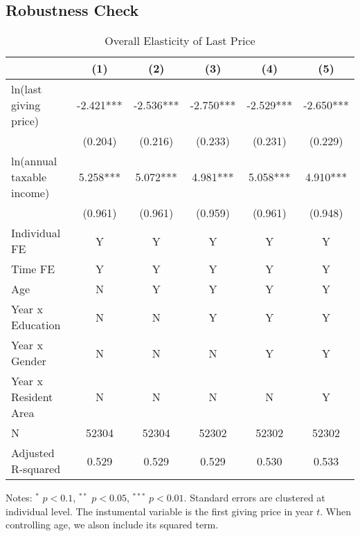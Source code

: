 \documentclass[
  11pt,
  a4paper,
]{article}
\begin{document}
\hypertarget{robustness-check}{%
\subsection{Robustness Check}\label{robustness-check}}

\begin{table}

\caption{\label{tab:LastOverall}Overall Elasticity of Last Price}
\centering
\fontsize{7}{9}\selectfont
\begin{threeparttable}
\begin{tabular}[t]{lccccc}
\toprule
 & (1) & (2) & (3) & (4) & (5)\\
\midrule
ln(last giving price) & -2.421*** & -2.536*** & -2.750*** & -2.529*** & -2.650***\\
 & (0.204) & (0.216) & (0.233) & (0.231) & (0.229)\\
ln(annual taxable income) & 5.258*** & 5.072*** & 4.981*** & 5.058*** & 4.910***\\
 & (0.961) & (0.961) & (0.959) & (0.961) & (0.948)\\
Individual FE & Y & Y & Y & Y & Y\\
Time FE & Y & Y & Y & Y & Y\\
Age & N & Y & Y & Y & Y\\
Year x Education & N & N & Y & Y & Y\\
Year x Gender & N & N & N & Y & Y\\
Year x Resident Area & N & N & N & N & Y\\
N & 52304 & 52304 & 52302 & 52302 & 52302\\
Adjusted R-squared & 0.529 & 0.529 & 0.529 & 0.530 & 0.533\\
\bottomrule
\end{tabular}
\begin{tablenotes}
\item Notes: $^{*}$ $p < 0.1$, $^{**}$ $p < 0.05$, $^{***}$ $p < 0.01$. Standard errors are clustered at individual level. The instumental variable is the first giving price in year $t$. When controlling age, we alson include its squared term.
\end{tablenotes}
\end{threeparttable}
\end{table}
\end{document}
